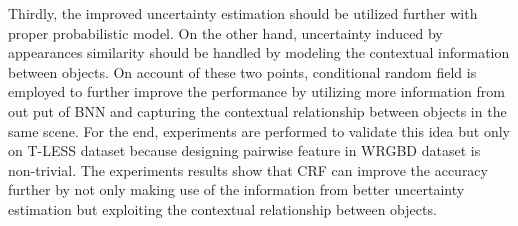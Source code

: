 Thirdly, the improved uncertainty estimation should be utilized further with proper probabilistic model. On the other hand, uncertainty induced by appearances similarity should be handled by modeling the contextual information between objects. On account of these two points, conditional random field is employed to further improve the performance by utilizing more information from out put of \gls{BNN} and capturing the contextual relationship between objects in the same scene. For the end, experiments are performed to validate this idea but only on T-LESS dataset because designing pairwise feature in \gls{WRGBD} dataset is non-trivial. The experiments results show that CRF can improve the accuracy further by not only making use of the information from better uncertainty estimation but exploiting the contextual relationship between objects.

